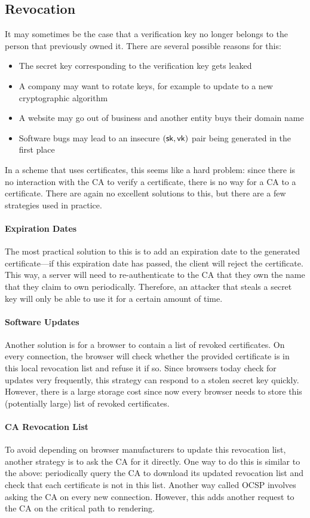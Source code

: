 \subsection{Revocation}
It may sometimes be the case that a verification key no longer belongs to the person that previously owned it. There are several possible reasons for this:
\begin{itemize}[noitemsep]
	\item The secret key corresponding to the verification key gets leaked
	\item A company may want to rotate keys, for example to update to a new cryptographic algorithm
	\item A website may go out of business and another entity buys their domain name
	\item Software bugs may lead to an insecure $({\mathsf{sk}}, \mathsf{vk})$ pair being generated in the first place
\end{itemize}

In a scheme that uses certificates, this seems like a hard problem: since there is no interaction with the CA to verify a certificate, there is no way for a CA to  a certificate. There are again no excellent solutions to this, but there are a few strategies used in practice.

\paragraph{Expiration Dates}
The most practical solution to this is to add an expiration date to the generated certificate---if this expiration date has passed, the client will reject the certificate. This way, a server will need to re-authenticate to the CA that they own the name that they claim to own periodically. Therefore, an attacker that steals a secret key will only be able to use it for a certain amount of time.

\paragraph{Software Updates}
Another solution is for a browser to contain a list of revoked certificates. On every connection, the browser will check whether the provided certificate is in this local revocation list and refuse it if so. Since browsers today check for updates very frequently, this strategy can respond to a stolen secret key quickly. However, there is a large storage cost since now every browser needs to store this (potentially large) list of revoked certificates.

\paragraph{CA Revocation List}
To avoid depending on browser manufacturers to update this revocation list, another strategy is to ask the CA for it directly. One way to do this is similar to the above: periodically query the CA to download its updated revocation list and check that each certificate is not in this list. Another way called OCSP involves asking the CA on every new connection. However, this adds another request to the CA on the critical path to rendering.
